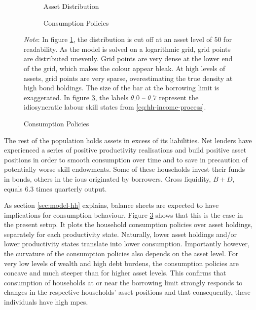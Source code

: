 \documentclass[12pt]{article} %
\numberwithin{equation}{section} %
\numberwithin{figure}{section}
\numberwithin{table}{section}
\begin{document}
\begin{figure}[t]
    \caption{Baseline Model: Initial Steady State}
    \label{fig:init-stst-dist-pol}
    \centering
    \begin{subfigure}[b]{0.49\textwidth}
    \caption{Asset Distribution}
    \label{fig:init-stst-dist-pol-a-dist}
         \centering
         
     \end{subfigure}
     \hfill
     \begin{subfigure}[b]{0.49\textwidth}
     \caption{Consumption Policies}
     \label{fig:init-stst-dist-pol-c}
         \centering
         
     \end{subfigure}

    \vspace{10pt}
     
     \justifying
     \footnotesize
	\textit{Note}: In figure \ref{fig:init-stst-dist-pol-a-dist}, the distribution is cut off at an asset level of $50$ for readability. As the model is solved on a logarithmic grid, grid points are distributed unevenly. Grid points are very dense at the lower end of the grid, which makes the colour appear bleak. At high levels of assets, grid points are very sparse, overestimating the true density at high bond holdings. The size of the bar at the borrowing limit is exaggerated. In figure \ref{fig:init-stst-dist-pol-c}, the labels $\theta\_0$ -- $\theta\_7$ represent the idiosyncratic labour skill states from \eqref{eq:hh-income-process}.
\end{figure}

The rest of the population holds assets in excess of its liabilities. Net lenders have experienced a series of positive productivity realisations and build positive asset positions in order to smooth consumption over time and to save in precaution of potentially worse skill endowments. Some of these households invest their funds in bonds, others in the \Gls{iou}s originated by borrowers. Gross liquidity, $B+D$, equals $6.3$ times quarterly output.

As section \ref{sec:model-hh} explains, balance sheets are expected to have implications for consumption behaviour. Figure \ref{fig:init-stst-dist-pol-c} shows that this is the case in the present setup. It plots the household consumption policies over asset holdings, separately for each productivity state. Naturally, lower asset holdings and/or lower productivity states translate into lower consumption. Importantly however, the curvature of the consumption policies also depends on the asset level. For very low levels of wealth and high debt burdens, the consumption policies are concave and much steeper than for higher asset levels. This confirms that consumption of households at or near the borrowing limit strongly responds to changes in the respective households' asset positions and that consequently, these individuals have high \Gls{mpc}s.
\end{document}
